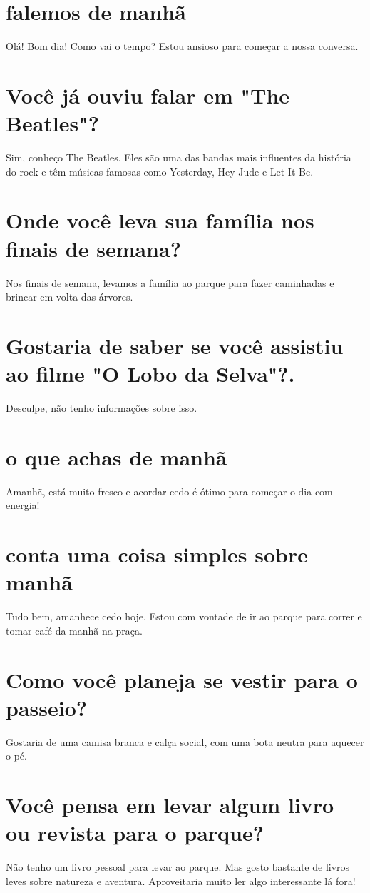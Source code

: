 \documentclass[11pt,a4paper]{article}
\begin{document}
\section{falemos de manhã}
Olá! Bom dia! Como vai o tempo? Estou ansioso para começar a nossa conversa.

\section{Você já ouviu falar em "The Beatles"?}
Sim, conheço The Beatles. Eles são uma das bandas mais influentes da história do rock e têm músicas famosas como Yesterday, Hey Jude e Let It Be.

\section{Onde você leva sua família nos finais de semana?}
Nos finais de semana, levamos a família ao parque para fazer caminhadas e brincar em volta das árvores.

\section{Gostaria de saber se você assistiu ao filme "O Lobo da Selva"?.}
Desculpe, não tenho informações sobre isso.

\section{o que achas de manhã}
Amanhã, está muito fresco e acordar cedo é ótimo para começar o dia com energia!

\section{conta uma coisa simples sobre manhã}
Tudo bem, amanhece cedo hoje. Estou com vontade de ir ao parque para correr e tomar café da manhã na praça.

\section{Como você planeja se vestir para o passeio?}
Gostaria de uma camisa branca e calça social, com uma bota neutra para aquecer o pé.

\section{Você pensa em levar algum livro ou revista para o parque?}
Não tenho um livro pessoal para levar ao parque. Mas gosto bastante de livros leves sobre natureza e aventura. Aproveitaria muito ler algo interessante lá fora!
\end{document}
